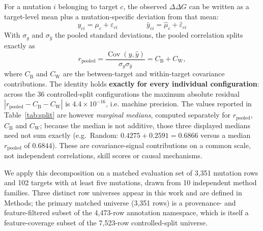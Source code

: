 \documentclass[11pt,a4paper]{article}
\begin{document}
For a mutation $i$ belonging to target $c$, the observed $\Delta\Delta G$ can be written as a
target-level mean plus a mutation-specific deviation from that mean:
\begin{equation}
  y_{ci} = \mu_c + \varepsilon_{ci}
  \qquad\qquad
  \hat{y}_{ci} = \hat{\mu}_c + \hat{\varepsilon}_{ci}
  \label{eq:decomp}
\end{equation}
With $\sigma_y$ and $\sigma_{\hat{y}}$ the pooled standard deviations, the pooled
correlation splits exactly as
\begin{equation}
  r_{\mathrm{pooled}}
    = \frac{\operatorname{Cov}(y,\hat{y})}{\sigma_y \sigma_{\hat{y}}}
    = C_{\mathrm{B}} + C_{\mathrm{W}},
  \label{eq:identity}
\end{equation}
where $C_{\mathrm{B}}$ and $C_{\mathrm{W}}$ are the between-target and within-target
covariance contributions. The identity holds \textbf{exactly for every individual configuration}: across the 36
controlled-split configurations the maximum absolute residual
$|r_{\mathrm{pooled}} - C_{\mathrm{B}} - C_{\mathrm{W}}|$ is $4.4 \times 10^{-16}$, i.e.
machine precision. The values reported in Table~\ref{tab:split} are however \emph{marginal
medians}, computed separately for $r_{\mathrm{pooled}}$, $C_{\mathrm{B}}$ and
$C_{\mathrm{W}}$; because the median is not additive, those three displayed medians need
not sum exactly (e.g.\ Random: $0.4275 + 0.2591 = 0.6866$ versus a median
$r_{\mathrm{pooled}}$ of $0.6844$). These are covariance-signal contributions on a common
scale, not independent correlations, skill scores or causal mechanisms.

We apply this decomposition on a matched evaluation set of 3{,}351 mutation rows and 102
targets with at least five mutations, drawn from 10 independent method families. Three
distinct row universes appear in this work and are defined in Methods; the primary
matched universe (3{,}351 rows) is a provenance- and feature-filtered subset of the
4{,}473-row annotation namespace, which is itself a feature-coverage subset of the
7{,}523-row controlled-split universe.
\end{document}
